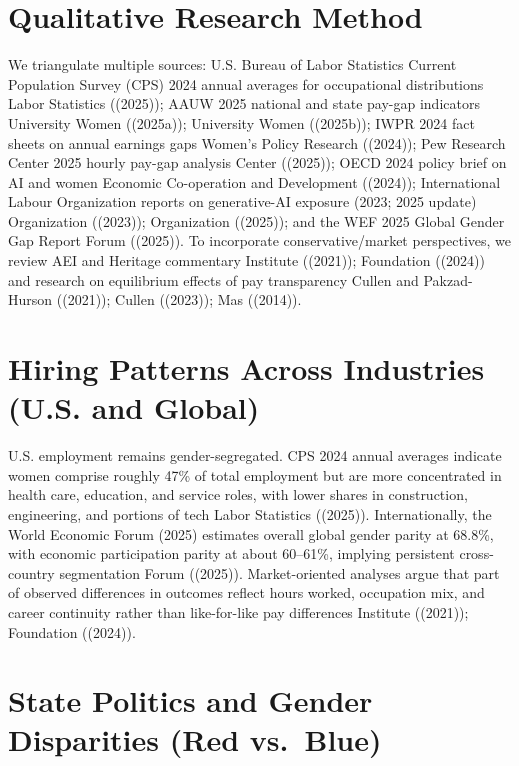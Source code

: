 \documentclass[
  letterpaper,
  DIV=11,
  numbers=noendperiod]{scrartcl}
\begin{document}
\section{Qualitative Research Method}\label{qualitative-research-method}

We triangulate multiple sources: U.S. Bureau of Labor Statistics Current
Population Survey (CPS) 2024 annual averages for occupational
distributions Labor Statistics ((2025)); AAUW 2025 national and state
pay-gap indicators University Women ((2025a)); University Women
((2025b)); IWPR 2024 fact sheets on annual earnings gaps Women's Policy
Research ((2024)); Pew Research Center 2025 hourly pay-gap analysis
Center ((2025)); OECD 2024 policy brief on AI and women Economic
Co-operation and Development ((2024)); International Labour Organization
reports on generative-AI exposure (2023; 2025 update) Organization
((2023)); Organization ((2025)); and the WEF 2025 Global Gender Gap
Report Forum ((2025)). To incorporate conservative/market perspectives,
we review AEI and Heritage commentary Institute ((2021)); Foundation
((2024)) and research on equilibrium effects of pay transparency Cullen
and Pakzad-Hurson ((2021)); Cullen ((2023)); Mas ((2014)).

\section{Hiring Patterns Across Industries (U.S. and
Global)}\label{hiring-patterns-across-industries-u.s.-and-global}

U.S. employment remains gender-segregated. CPS 2024 annual averages
indicate women comprise roughly 47\% of total employment but are more
concentrated in health care, education, and service roles, with lower
shares in construction, engineering, and portions of tech Labor
Statistics ((2025)). Internationally, the World Economic Forum (2025)
estimates overall global gender parity at 68.8\%, with economic
participation parity at about 60--61\%, implying persistent
cross-country segmentation Forum ((2025)). Market-oriented analyses
argue that part of observed differences in outcomes reflect hours
worked, occupation mix, and career continuity rather than like-for-like
pay differences Institute ((2021)); Foundation ((2024)).

\section{State Politics and Gender Disparities (Red
vs.~Blue)}\label{state-politics-and-gender-disparities-red-vs.-blue}
\end{document}

